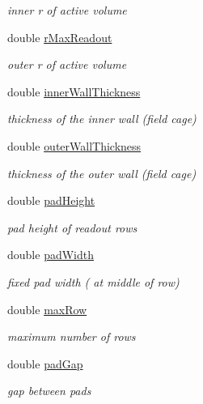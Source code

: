 \begin{DoxyCompactItemize}
\begin{DoxyCompactList}\small\item\em inner r of active volume \item\end{DoxyCompactList}\item 
double \hyperlink{struct_d_d4hep_1_1_d_d_rec_1_1_fixed_pad_size_t_p_c_struct_adf51c80b073c09ae26ce58fec05324ae}{rMaxReadout}
\begin{DoxyCompactList}\small\item\em outer r of active volume \item\end{DoxyCompactList}\item 
double \hyperlink{struct_d_d4hep_1_1_d_d_rec_1_1_fixed_pad_size_t_p_c_struct_a3c12241f45c3762bd94ca39febc2f74a}{innerWallThickness}
\begin{DoxyCompactList}\small\item\em thickness of the inner wall (field cage) \item\end{DoxyCompactList}\item 
double \hyperlink{struct_d_d4hep_1_1_d_d_rec_1_1_fixed_pad_size_t_p_c_struct_aafd297bbbf6703fe145eadc4eeaa38fc}{outerWallThickness}
\begin{DoxyCompactList}\small\item\em thickness of the outer wall (field cage) \item\end{DoxyCompactList}\item 
double \hyperlink{struct_d_d4hep_1_1_d_d_rec_1_1_fixed_pad_size_t_p_c_struct_ab95a90cdaafbb23696608e1d1ad0df14}{padHeight}
\begin{DoxyCompactList}\small\item\em pad height of readout rows \item\end{DoxyCompactList}\item 
double \hyperlink{struct_d_d4hep_1_1_d_d_rec_1_1_fixed_pad_size_t_p_c_struct_aeac7b4785ec2067ddf6d50b8e19c8ee0}{padWidth}
\begin{DoxyCompactList}\small\item\em fixed pad width ( at middle of row) \item\end{DoxyCompactList}\item 
double \hyperlink{struct_d_d4hep_1_1_d_d_rec_1_1_fixed_pad_size_t_p_c_struct_acb713c655ac777ede8f3c951f4f83a1e}{maxRow}
\begin{DoxyCompactList}\small\item\em maximum number of rows \item\end{DoxyCompactList}\item 
double \hyperlink{struct_d_d4hep_1_1_d_d_rec_1_1_fixed_pad_size_t_p_c_struct_a28e26e987689e132b295e84586133520}{padGap}
\begin{DoxyCompactList}\small\item\em gap between pads \item\end{DoxyCompactList}\end{DoxyCompactItemize}


